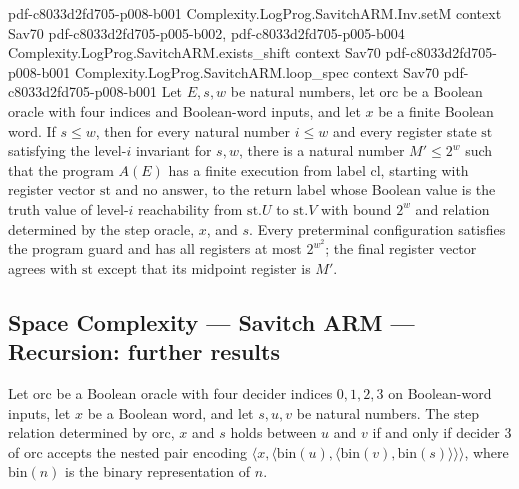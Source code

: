 \begin{theorem}
  {pdf-c8033d2fd705-p008-b001}
\proofstep
  {Complexity.LogProg.SavitchARM.Inv.setM}
  {context}
  {Sav70}
  {pdf-c8033d2fd705-p005-b002,
    pdf-c8033d2fd705-p005-b004}
\proofstep
  {Complexity.LogProg.SavitchARM.exists_shift}
  {context}
  {Sav70}
  {pdf-c8033d2fd705-p008-b001}
\proofstep
  {Complexity.LogProg.SavitchARM.loop_spec}
  {context}
  {Sav70}
  {pdf-c8033d2fd705-p008-b001}
Let $E,s,w$ be natural numbers, let $\mathrm{orc}$ be a Boolean oracle with four indices and
Boolean-word inputs, and let $x$ be a finite Boolean word. If $s\le w$, then for every
natural number $i\le w$ and every register state $\mathrm{st}$ satisfying the level-$i$
invariant for $s,w$, there is a natural number $M'\le 2^w$ such that the program $A(E)$
has a finite execution from label $\mathrm{cl}$, starting with register vector $\mathrm{st}$ and no
answer, to the return label whose Boolean value is the truth value of level-$i$
reachability from $\mathrm{st}.U$ to $\mathrm{st}.V$ with bound $2^w$ and relation determined by the
step oracle, $x$, and $s$. Every preterminal configuration satisfies the program guard
and has all registers at most $2^{w^2}$; the final register vector agrees with $\mathrm{st}$
except that its midpoint register is $M'$.
\end{theorem}

\subsection*{Space Complexity --- Savitch ARM --- Recursion: further results}

\begin{theorem}
\label{Complexity.LogProg.SavitchARM.rel_iff_orc}
\leanok
{}
Let $\mathrm{orc}$ be a Boolean oracle with four decider indices $0,1,2,3$ on Boolean-word
inputs, let $x$ be a Boolean word, and let $s,u,v$ be natural numbers. The step relation
determined by $\mathrm{orc}$, $x$ and $s$ holds between $u$ and $v$ if and only if decider
$3$ of $\mathrm{orc}$ accepts the nested pair encoding
$\langle x,\langle \mathrm{bin}(u),\langle \mathrm{bin}(v),\mathrm{bin}(s)\rangle\rangle\rangle$,
where $\mathrm{bin}(n)$ is the binary representation of $n$.
\end{theorem}
